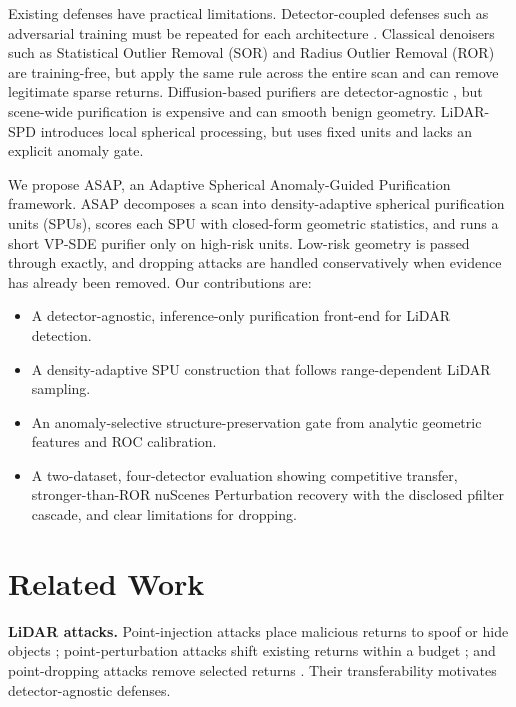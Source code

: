 \documentclass[conference]{IEEEtran}
\begin{document}
Existing defenses have practical limitations. Detector-coupled defenses such as adversarial training must be repeated for each architecture \cite{liu2019extending,sun2020towards}. Classical denoisers such as Statistical Outlier Removal (SOR) and Radius Outlier Removal (ROR) \cite{rusu2008towards} are training-free, but apply the same rule across the entire scan and can remove legitimate sparse returns. Diffusion-based purifiers are detector-agnostic \cite{nie2022diffpure,zhang2023ada3diff}, but scene-wide purification is expensive and can smooth benign geometry. LiDAR-SPD \cite{lidarspd} introduces local spherical processing, but uses fixed units and lacks an explicit anomaly gate.

We propose ASAP, an Adaptive Spherical Anomaly-Guided Purification framework. ASAP decomposes a scan into density-adaptive spherical purification units (SPUs), scores each SPU with closed-form geometric statistics, and runs a short VP-SDE purifier only on high-risk units. Low-risk geometry is passed through exactly, and dropping attacks are handled conservatively when evidence has already been removed. Our contributions are:

\begin{itemize}
\item A detector-agnostic, inference-only purification front-end for LiDAR detection.
\item A density-adaptive SPU construction that follows range-dependent LiDAR sampling.
\item An anomaly-selective structure-preservation gate from analytic geometric features and ROC calibration.
\item A two-dataset, four-detector evaluation showing competitive transfer, stronger-than-ROR nuScenes Perturbation recovery with the disclosed pfilter cascade, and clear limitations for dropping.
\end{itemize}

\section{Related Work}

\textbf{LiDAR attacks.} Point-injection attacks place malicious returns to spoof or hide objects \cite{cao2019adversarial,tu2020physically}; point-perturbation attacks shift existing returns within a budget \cite{xiang2019pointcloud,liu2019extending}; and point-dropping attacks remove selected returns \cite{zheng2019pointcloud}. Their transferability motivates detector-agnostic defenses.
\end{document}
